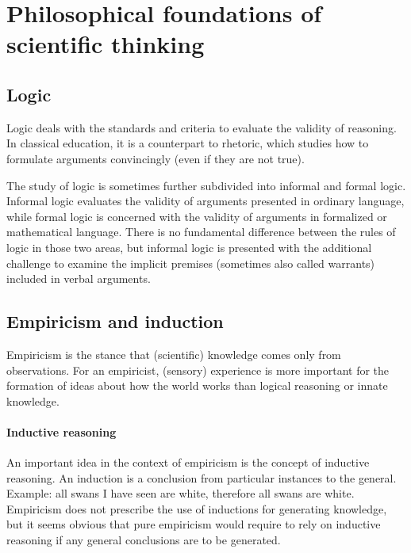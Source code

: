 \documentclass{tufte-book}
\begin{document}
\section{Philosophical foundations of scientific thinking}



\subsection{Logic}

Logic deals with the standards and criteria to evaluate the validity of reasoning. In classical education, it is a counterpart to rhetoric, which studies how to formulate arguments convincingly (even if they are not true). 

The study of logic is sometimes further subdivided into informal and formal logic. Informal logic evaluates the validity of arguments presented in ordinary language, while formal logic is concerned with the validity of arguments in formalized or mathematical language. There is no fundamental difference between the rules of logic in those two areas, but informal logic is presented with the additional challenge to examine the implicit premises (sometimes also called warrants) included in verbal arguments. 


\subsection{Empiricism and induction}

Empiricism is the stance that (scientific) knowledge comes only from observations. For an empiricist, (sensory) experience is more important for the formation of ideas about how the world works than logical reasoning or innate knowledge. 

\paragraph{Inductive reasoning} An important idea in the context of empiricism is the concept of inductive reasoning. An induction is a conclusion from particular instances to the general. Example: all swans I have seen are white, therefore all swans are white. Empiricism does not prescribe the use of inductions for generating knowledge, but it seems obvious that pure empiricism would require to rely on inductive reasoning if any general conclusions are to be generated. 
\end{document}
